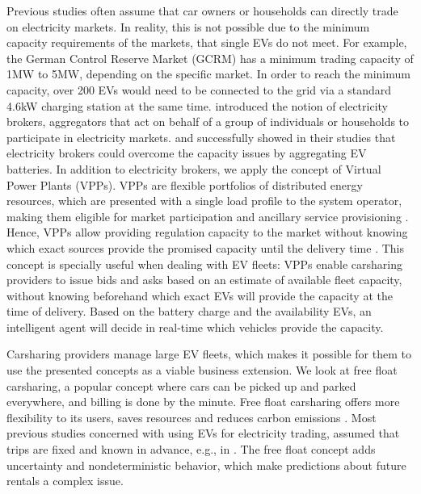 \documentclass[12pt, article]{article}
\begin{document}
Previous studies often assume that car owners or households can directly trade
on electricity markets. In reality, this is not possible due to the minimum
capacity requirements of the markets, that single EVs do not meet. For example,
the German Control Reserve Market (GCRM) has a minimum trading capacity of 1MW
to 5MW, depending on the specific market. In order to reach the minimum
capacity, over 200 EVs would need to be connected to the grid via a standard
4.6kW charging station at the same time. \textcite{ketter13_power_tac} introduced
the notion of electricity brokers, aggregators that act on behalf of a group of
individuals or households to participate in electricity markets.
\textcite{brandt17_evaluat_busin_model_vehic_grid_integ} and
\textcite{kahlen14_balan_with_elect_vehic} successfully showed in their studies
that electricity brokers could overcome the capacity issues by aggregating EV
batteries. In addition to electricity brokers, we apply the concept of Virtual
Power Plants (VPPs). VPPs are flexible portfolios of distributed energy
resources, which are presented with a single load profile to the system
operator, making them eligible for market participation and ancillary service
provisioning \parencite{pudjianto07_virtual_power_plant_system_integ}. Hence, VPPs
allow providing regulation capacity to the market without knowing which exact
sources provide the promised capacity until the delivery time
\parencite{kahlen17_fleet}. This concept is specially useful when dealing with
EV fleets: VPPs enable carsharing providers to issue bids and asks based on an
estimate of available fleet capacity, without knowing beforehand which exact EVs
will provide the capacity at the time of delivery. Based on the battery charge
and the availability EVs, an intelligent agent will decide in real-time which
vehicles provide the capacity.

Carsharing providers manage large EV fleets, which makes it possible for them to
use the presented concepts as a viable business extension. We look at free float
carsharing, a popular concept where cars can be picked up and parked everywhere,
and billing is done by the minute. Free float carsharing offers more flexibility
to its users, saves resources and reduces carbon emissions
\parencite{firnkorn15_free_float_elect_carsh_fleet_smart_cities}. Most previous
studies concerned with using EVs for electricity trading, assumed that trips are
fixed and known in advance, e.g., in
\textcite{tomic07_using_fleet_elect_drive_vehic_grid_suppor}. The free float
concept adds uncertainty and nondeterministic behavior, which make predictions
about future rentals a complex issue.
\end{document}
